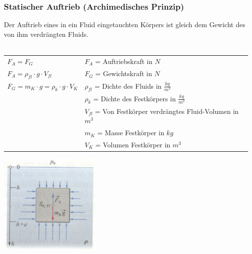 	\subsubsection{Statischer Auftrieb (Archimedisches Prinzip)}
		\begin{minipage}[t]{13cm}
			Der Auftrieb eines in ein Fluid eingetauchten Körpers ist gleich dem Gewicht des von ihm verdrängten Fluids.\\ \\
			\renewcommand{\arraystretch}{1.5}
			\begin{tabular}{ p{4cm} p{7cm}}
				$F_A = F_G$	&	$F_A$ = Auftriebskraft in $N$\\
				$F_A = \rho_{fl} \cdot g \cdot V_{fl}$	& $F_G$ = Gewichtskraft in $N$\\
				$F_G = m_K \cdot g = \rho_k \cdot g \cdot V_K$	& $\rho_{fl}$ = Dichte des Fluids in $\frac{kg}{m^3}$\\
				& $\rho_{k}$ = Dichte des Festkörpers in $\frac{kg}{m^3}$\\
				& $V_{fl}$ = Von Festkörper verdrängtes Fluid-Volumen in $m^3$\\
				& $m_K$ = Masse Festkörper in $kg$\\
				& $V_K$ = Volumen Festkörper in $m^3$\\
			\end{tabular}
			\renewcommand{\arraystretch}{1}
		\end{minipage}
		\begin{minipage}[t]{10cm}
			\vspace{-\ht\strutbox}\includegraphics[width=5cm]{./bilder/StatischerAuftrieb.jpg}
		\end{minipage}
	
